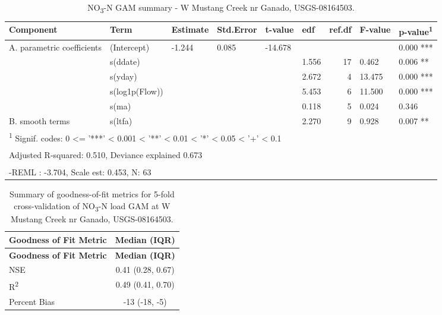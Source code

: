 \documentclass[
]{article}
\newenvironment{widestuff}{\begin{table}[h]\begin{adjustwidth}{-4.5cm}{-4.5cm}\centering}{\end{adjustwidth}\end{table}}
\begin{document}
\begin{widestuff}

\caption{NO\textsubscript{3}-N GAM summary - W Mustang Creek nr Ganado, USGS-08164503.}
\centering
\begin{tabular}[t]{llllllrll}
\toprule
Component & Term & Estimate & Std.Error & t-value & edf & ref.df & F-value & p-value\textsuperscript{1}\\
\midrule
A. parametric coefficients & (Intercept) & -1.244 & 0.085 & -14.678 &  &  &  & 0.000 ***\\
\cmidrule{1-9}
 & s(ddate) &  &  &  & 1.556 & 17 & 0.462 & 0.006 **\\

 & s(yday) &  &  &  & 2.672 & 4 & 13.475 & 0.000 ***\\

 & s(log1p(Flow)) &  &  &  & 5.453 & 6 & 11.500 & 0.000 ***\\

 & s(ma) &  &  &  & 0.118 & 5 & 0.024 & 0.346\\

\multirow[t]{-5}{*}{\raggedright\arraybackslash B. smooth terms} & s(ltfa) &  &  &  & 2.270 & 9 & 0.928 & 0.007 **\\
\bottomrule
\multicolumn{9}{l}{\textsuperscript{1} Signif. codes: 0 <= '***' < 0.001 < '**' < 0.01 < '*' < 0.05 < '+' < 0.1}\\
\multicolumn{9}{l}{\textsuperscript{} Adjusted R-squared: 0.510, Deviance explained 0.673}\\
\multicolumn{9}{l}{\textsuperscript{} -REML : -3.704, Scale est: 0.453, N: 63}\\
\end{tabular}
\end{widestuff}

\hypertarget{tbl-NO08164503-CV}{}
\begin{longtable}[]{@{}lc@{}}
\caption{\label{tbl-NO08164503-CV}Summary of goodness-of-fit metrics for
5-fold cross-validation of NO\textsubscript{3}-N load GAM at W Mustang
Creek nr Ganado, USGS-08164503.}\tabularnewline
\toprule()
\textbf{Goodness of Fit Metric} & \textbf{Median (IQR)} \\
\midrule()
\endfirsthead
\toprule()
\textbf{Goodness of Fit Metric} & \textbf{Median (IQR)} \\
\midrule()
\endhead
NSE & 0.41 (0.28, 0.67) \\
R\textsuperscript{2} & 0.49 (0.41, 0.70) \\
Percent Bias & -13 (-18, -5) \\
\bottomrule()
\end{longtable}
\end{document}
